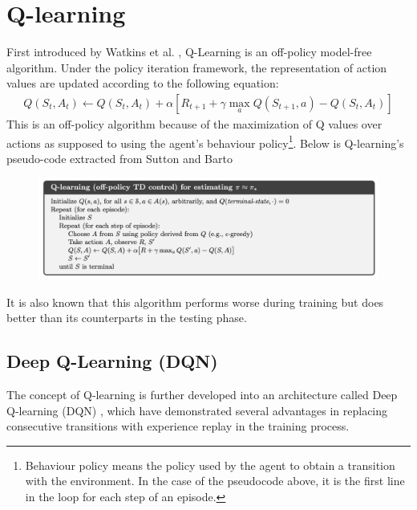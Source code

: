 \documentclass[12pt]{report}
\begin{document}
\section{Q-learning}
First introduced by Watkins et al. \cite{watkins1992q}, Q-Learning is an off-policy model-free algorithm. Under the policy iteration framework, the representation of action values are updated according to the following equation:
\begin{align}
    Q(S_t,A_t) \leftarrow Q(S_t,A_t) + \alpha\left[R_{t+1}+\gamma \max_a Q(S_{t+1},a) - Q(S_t,A_t)\right] \label{eq:bellman-q-learning}
\end{align}
This is an off-policy algorithm because of the maximization of Q values over actions as supposed to using the agent's behaviour policy\footnote{Behaviour policy means the policy used by the agent to obtain a transition with the environment. In the case of the pseudocode above, it is the first line in the loop for each step of an episode.}. Below is Q-learning's pseudo-code extracted from Sutton and Barto \cite{sutton2018reinforcement}
\begin{figure}[H]
    \center
    \includegraphics[width=0.9\linewidth]{figs/q_learning.png}
    \label{fig:qlearning}
\end{figure}
It is also known that this algorithm performs worse during training but does better than its counterparts in the testing phase.

\subsection{Deep Q-Learning (DQN)}\label{sec:DQN}

The concept of Q-learning is further developed into an architecture called Deep Q-learning (DQN) \cite{mnih2013playing}, which have demonstrated several advantages in replacing consecutive transitions with experience replay in the training process.\\
\end{document}
